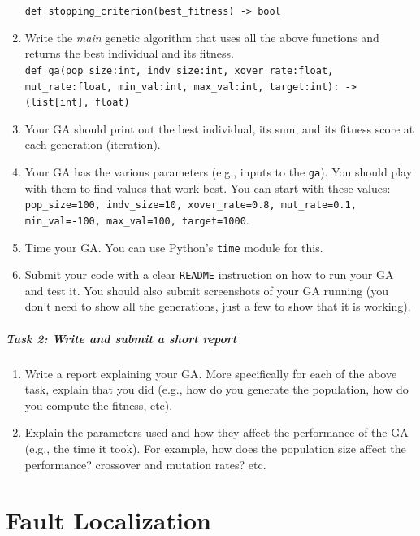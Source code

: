 \documentclass[oneside,11pt,dvipsnames]{book}
\newcommand{\code}[1]{\texttt{#1}}
\begin{document}
\begin{enumerate}
    \code{def stopping\_criterion(best\_fitness) -> bool}
    \item Write the \emph{main} genetic algorithm that uses all the above functions and returns the best individual and its fitness.\\
    \code{def ga(pop\_size:int, indv\_size:int, xover\_rate:float, mut\_rate:float, min\_val:int, max\_val:int, target:int): -> (list[int], float)}
    \item Your GA should print out the best individual, its sum, and its fitness score at each generation (iteration).
    \item Your GA has the various parameters (e.g., inputs to the \code{ga}). You should play with them to find values that work best.  You can start with these values: \code{pop\_size=100, indv\_size=10, xover\_rate=0.8, mut\_rate=0.1, min\_val=-100, max\_val=100, target=1000}.
    \item Time your GA. You can use Python's \code{time} module for this.
    \item Submit your code with a clear \code{README} instruction on how to run your GA and test it. You should also submit screenshots of your GA running (you don't need to show all the generations, just a few to show that it is working).
\end{enumerate}

\paragraph{Task 2: Write and submit a short report}
\begin{enumerate}
\item Write a report explaining your GA. More specifically for each of the above task, explain that you did (e.g., how do you generate the population, how do you compute the fitness, etc).

\item Explain the parameters used and how they affect the performance of the GA (e.g., the time it took).  For example, how does the population size affect the performance? crossover and mutation rates? etc.

\end{enumerate}




\chapter{Fault Localization}\label{chapter:debugging}
\end{document}
